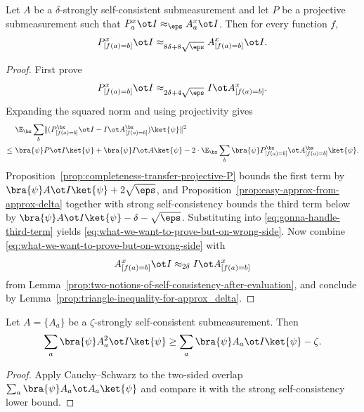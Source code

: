 \begin{lemma}\label{prop:self-consistency-implies-data-processing}
	\leanok
	Let $A$ be a $\delta$-strongly self-consistent submeasurement and let $P$ be a projective submeasurement such that $P_a^x \ot I \approx_\eps A_a^x \ot I$. Then for every function $f$,
	\[
		P_{[f(a)=b]}^x \ot I \approx_{8\delta + 8\sqrt\eps} A_{[f(a)=b]}^x \ot I.
	\]
\end{lemma}
\begin{proof}
	\leanok
	First prove
	\begin{equation}
		P^x_{[f(a)=b]} \ot I \approx_{2\delta + 4\sqrt{\eps}} I \ot A_{[f(a)=b]}^x.
		\label{eq:what-we-want-to-prove-but-on-wrong-side}
	\end{equation}
	Expanding the squared norm and using projectivity gives
	\begin{align}
		      & \E_{\bx} \sum_b \lVert(P^{\bx}_{[f(a)=b]} \ot I - I \ot A_{[f(a)=b]}^{\bx}) \ket{\psi} \rVert^2 \nonumber \\
		\leq~ & \bra{\psi} P \ot I \ket{\psi} + \bra{\psi} I \ot A \ket{\psi}
		- 2\cdot \E_{\bx} \sum_b \bra{\psi}  P^{\bx}_{[f(a)=b]} \ot A^{\bx}_{[f(a)=b]} \ket{\psi}.
		\label{eq:gonna-handle-third-term}
	\end{align}
	Proposition~\ref{prop:completeness-transfer-projective-P} bounds the first term by $\bra{\psi} A \ot I \ket{\psi}+2\sqrt{\eps}$, and Proposition~\ref{prop:easy-approx-from-approx-delta} together with strong self-consistency bounds the third term below by $\bra{\psi} A \ot I \ket{\psi}-\delta-\sqrt{\eps}$. Substituting into \eqref{eq:gonna-handle-third-term} yields \eqref{eq:what-we-want-to-prove-but-on-wrong-side}. Now combine \eqref{eq:what-we-want-to-prove-but-on-wrong-side} with
	\[
		A^x_{[f(a)=b]} \ot I \approx_{2\delta} I \ot A^x_{[f(a)=b]}
	\]
	from Lemma~\ref{prop:two-notions-of-self-consistency-after-evaluation}, and conclude by Lemma~\ref{prop:triangle-inequality-for-approx_delta}.
\end{proof}

\begin{lemma}\label{lem:self-consistency-same-side-square}
	\leanok
	Let $A=\{A_a\}$ be a $\zeta$-strongly self-consistent submeasurement. Then
	\[
		\sum_a \bra{\psi} A_a^2 \ot I \ket{\psi}
		\ge
		\sum_a \bra{\psi} A_a \ot I \ket{\psi} - \zeta.
	\]
\end{lemma}
\begin{proof}
	\leanok
	Apply Cauchy--Schwarz to the two-sided overlap $\sum_a \bra{\psi} A_a \ot A_a \ket{\psi}$ and compare it with the strong self-consistency lower bound.
\end{proof}

